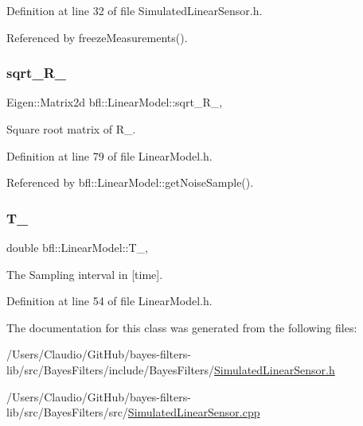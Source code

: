 Definition at line 32 of file Simulated\+Linear\+Sensor.\+h.



Referenced by freeze\+Measurements().

\mbox{\label{classbfl_1_1LinearModel_abfb1e70c848b8c3406551b13b4926701}} 
\subsubsection{\texorpdfstring{sqrt\+\_\+\+R\+\_\+}{sqrt\_R\_}}
{\footnotesize\ttfamily Eigen\+::\+Matrix2d bfl\+::\+Linear\+Model\+::sqrt\+\_\+\+R\+\_\+\hspace{0.3cm}{\ttfamily [protected]}, {\ttfamily [inherited]}}



Square root matrix of R\+\_\+. 



Definition at line 79 of file Linear\+Model.\+h.



Referenced by bfl\+::\+Linear\+Model\+::get\+Noise\+Sample().

\mbox{\label{classbfl_1_1LinearModel_a61e864670a689d32e6fc8be775f2ee86}} 
\subsubsection{\texorpdfstring{T\+\_\+}{T\_}}
{\footnotesize\ttfamily double bfl\+::\+Linear\+Model\+::\+T\+\_\+\hspace{0.3cm}{\ttfamily [protected]}, {\ttfamily [inherited]}}



The Sampling interval in \mbox{[}time\mbox{]}. 



Definition at line 54 of file Linear\+Model.\+h.



The documentation for this class was generated from the following files\+:\begin{DoxyCompactItemize}
\item 
/\+Users/\+Claudio/\+Git\+Hub/bayes-\/filters-\/lib/src/\+Bayes\+Filters/include/\+Bayes\+Filters/\mbox{\hyperlink{SimulatedLinearSensor_8h}{Simulated\+Linear\+Sensor.\+h}}\item 
/\+Users/\+Claudio/\+Git\+Hub/bayes-\/filters-\/lib/src/\+Bayes\+Filters/src/\mbox{\hyperlink{SimulatedLinearSensor_8cpp}{Simulated\+Linear\+Sensor.\+cpp}}\end{DoxyCompactItemize}
